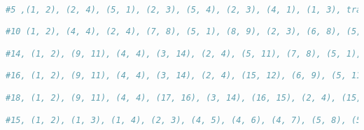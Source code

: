 \documentclass{article}
\begin{document}
\begin{lstlisting}[language=Python]
        



#5 ,(1, 2), (2, 4), (5, 1), (2, 3), (5, 4), (2, 3), (4, 1), (1, 3), trail

#10 (1, 2), (4, 4), (2, 4), (7, 8), (5, 1), (8, 9), (2, 3), (6, 8), (5, 4), (7, 8), (2, 3), (10, 9), (4, 1), (6, 10), (1, 3), not connected 

#14, (1, 2), (9, 11), (4, 4), (3, 14), (2, 4), (5, 11), (7, 8), (5, 1), (11, 13), (8, 9), (5, 13), (2, 3), (14, 11), (6, 8), (13, 2), (5, 4), (7, 8), (9, 14), (2, 3), (10, 9), (4, 1), (13, 2), (6, 10), (1, 3), not connected since 12 is never reached.

#16, (1, 2), (9, 11), (4, 4), (3, 14), (2, 4), (15, 12), (6, 9), (5, 11), (7, 8), (5, 1), (11, 13), (8, 9), (5, 13), (2, 3), (14, 11), (6, 8), (13, 2), (5, 4), (16, 1), (7, 8), (15, 6), (9, 14), (11, 16), (2, 3), (15, 2), (4, 12), (10, 9), (4, 1), (13, 2), (6, 10), (1, 3) Too many odd.

#18, (1, 2), (9, 11), (4, 4), (17, 16), (3, 14), (16, 15), (2, 4), (15, 12), (6, 9), (13, 13), (5, 11), (7, 8),  (17, 11),  (2, 14), (5, 1), (11, 13), (8, 9), (5, 13), (2, 3), (1, 18), (14, 11), (6, 8), (13, 2),(5, 4), (18, 9), (16, 1), (7, 8), (15, 6), (9, 14), (11, 16), (2, 3), (15, 2), (4, 12), (10, 9), (4, 1), (13, 2), (6, 10), (1, 3) tour

#15, (1, 2), (1, 3), (1, 4), (2, 3), (4, 5), (4, 6), (4, 7), (5, 8), (5, 9), (5, 10), (6, 7), (8, 9), (10, 11), (10, 12), (10, 13), (11, 14), (11, 15), (12, 13), (14, 15) trail
\end{lstlisting}
\end{document}
